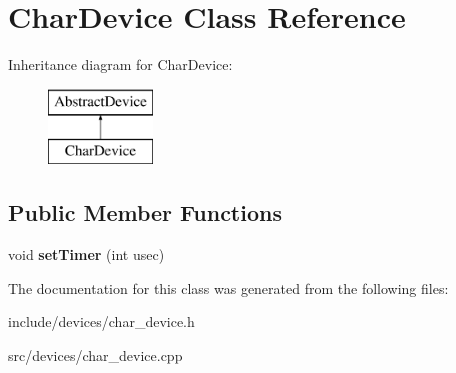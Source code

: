 \hypertarget{classCharDevice}{\section{\-Char\-Device \-Class \-Reference}
\label{d8/d4f/classCharDevice}
}
\-Inheritance diagram for \-Char\-Device\-:\begin{figure}[H]
\begin{center}
\leavevmode
\includegraphics[height=2.000000cm]{d8/d4f/classCharDevice}
\end{center}
\end{figure}
\subsection*{\-Public \-Member \-Functions}
\begin{DoxyCompactItemize}
\item 
\hypertarget{classCharDevice_a8689c0a03b971367322a9dd25bcfb7db}{void {\bfseries set\-Timer} (int usec)}\label{d8/d4f/classCharDevice_a8689c0a03b971367322a9dd25bcfb7db}

\end{DoxyCompactItemize}


\-The documentation for this class was generated from the following files\-:\begin{DoxyCompactItemize}
\item 
include/devices/char\-\_\-device.\-h\item 
src/devices/char\-\_\-device.\-cpp\end{DoxyCompactItemize}
